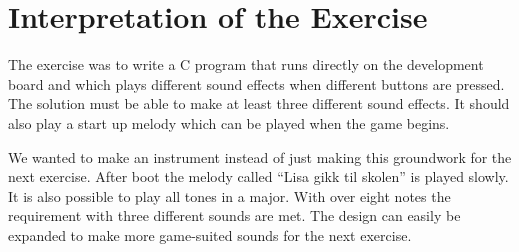 \section{Interpretation of the Exercise}
The exercise was to write a C program that runs directly on the development board and which plays different sound effects when different buttons are pressed. The solution must be able to make at least three different sound effects. It should also play a start up melody which can be played when the game begins.

We wanted to make an instrument instead of just making this groundwork for the next exercise. After boot the melody called “Lisa gikk til skolen” is played slowly. It is also possible to play all tones in a major. With over eight notes the requirement with three different sounds are met. The design can easily be expanded to make more game-suited sounds for the next exercise. 
